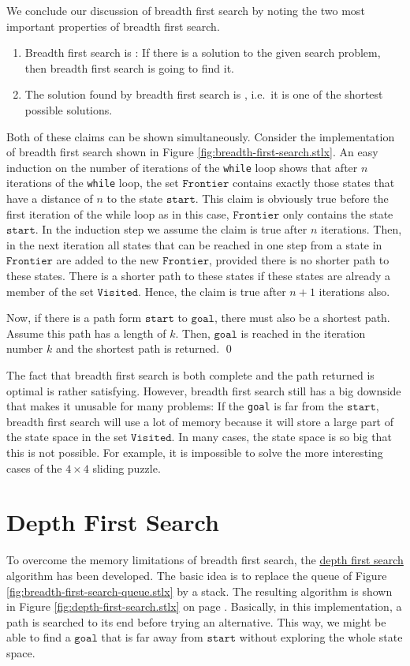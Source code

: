 We conclude our discussion of breadth first search by noting the two most important properties of
breadth first search.
\begin{enumerate}
\item Breadth first search is :  If there is a solution to the given
      search problem, then breadth first search is going to find it.
\item The solution found by breadth first search is , i.e.~it is one of the
      shortest possible solutions.
\end{enumerate}
\proof
Both of these claims can be shown simultaneously.  Consider the implementation of breadth first
search shown in Figure \ref{fig:breadth-first-search.stlx}.  An easy induction on the number of
iterations of the \texttt{while} loop shows that after $n$ iterations of the \texttt{while} loop,
the set $\mathtt{Frontier}$ contains exactly those states that have a distance of $n$ to the state
$\mathtt{start}$.  This claim is obviously true before the first iteration of the while loop as in
this case, $\mathtt{Frontier}$ only contains the state $\mathtt{start}$.  In the induction step we
assume the claim is true after $n$ iterations.  Then, in the next iteration all states that can be
reached in one step from a state in $\mathtt{Frontier}$ are added to the new $\mathtt{Frontier}$,
provided there is no shorter path to these states.  There is a shorter path to these states if these
states are already a member of the set $\mathtt{Visited}$.  Hence, the claim is true after $n+1$
iterations also.

Now, if there is a path form $\mathtt{start}$ to $\mathtt{goal}$, there must also be a shortest
path.  Assume this path has a length of $k$.  Then, $\mathtt{goal}$ is reached in the iteration
number $k$ and the shortest path is returned.
\qed

The fact that breadth first search is both complete and the path returned is optimal is rather
satisfying.  However, breadth first search still has a big downside that makes it unusable for
many problems:  If the \texttt{goal} is far from the $\mathtt{start}$, breadth first search will use
a lot of memory because it will store a large part of the state space in the set
$\mathtt{Visited}$.  In many cases, the state space is so big that this is not possible.  For example, it is
impossible to solve the more interesting cases of the $4 \times 4$ sliding puzzle.
\pagebreak


\section{Depth First Search}
To overcome the memory limitations of breadth first search, the
\href{https://en.wikipedia.org/wiki/Depth-first_search}{depth first search} algorithm has been
developed.  The basic idea is to replace the queue of Figure
\ref{fig:breadth-first-search-queue.stlx} by a stack.  The resulting algorithm is shown in Figure
\ref{fig:depth-first-search.stlx} on page \pageref{fig:depth-first-search.stlx}.  Basically, in this
implementation, a path is searched to its end before trying an alternative.  This way, we might be able to find a
$\mathtt{goal}$ that is far away from $\mathtt{start}$ without exploring the whole state space.


